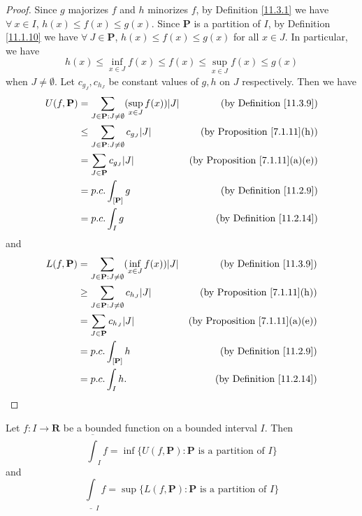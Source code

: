 \begin{proof}
    Since \(g\) majorizes \(f\) and \(h\) minorizes \(f\), by Definition \ref{11.3.1} we have \(\forall\ x \in I\), \(h(x) \leq f(x) \leq g(x)\).
    Since \(\mathbf{P}\) is a partition of \(I\), by Definition \ref{11.1.10} we have \(\forall\ J \in \mathbf{P}\), \(h(x) \leq f(x) \leq g(x)\) for all \(x \in J\).
    In particular, we have
    \[
        h(x) \leq \inf_{x \in J} f(x) \leq f(x) \leq \sup_{x \in J} f(x) \leq g(x)
    \]
    when \(J \neq \emptyset\).
    Let \(c_{g_J}, c_{h_J}\) be constant values of \(g, h\) on \(J\) respectively.
    Then we have
    \begin{align*}
        U(f, \mathbf{P}) & = \sum_{J \in \mathbf{P} : J \neq \emptyset} (\sup_{x \in J} f(x)) \abs*{J} & \text{(by Definition \ref{11.3.9})} \\
        & \leq \sum_{J \in \mathbf{P} : J \neq \emptyset} c_{g_J} \abs*{J} & \text{(by Proposition \ref{7.1.11}(h))} \\
        & = \sum_{J \in \mathbf{P}} c_{g_J} \abs*{J} & \text{(by Proposition \ref{7.1.11}(a)(e))} \\
        & = p.c. \int_{[\mathbf{P}]} g & \text{(by Definition \ref{11.2.9})} \\
        & = p.c. \int_I g & \text{(by Definition \ref{11.2.14})}
    \end{align*}
    and
    \begin{align*}
        L(f, \mathbf{P}) & = \sum_{J \in \mathbf{P} : J \neq \emptyset} (\inf_{x \in J} f(x)) \abs*{J} & \text{(by Definition \ref{11.3.9})} \\
        & \geq \sum_{J \in \mathbf{P} : J \neq \emptyset} c_{h_J} \abs*{J} & \text{(by Proposition \ref{7.1.11}(h))} \\
        & = \sum_{J \in \mathbf{P}} c_{h_J} \abs*{J} & \text{(by Proposition \ref{7.1.11}(a)(e))} \\
        & = p.c. \int_{[\mathbf{P}]} h & \text{(by Definition \ref{11.2.9})} \\
        & = p.c. \int_I h. & \text{(by Definition \ref{11.2.14})}
    \end{align*}
\end{proof}

\begin{proposition}\label{11.3.12}
    Let \(f : I \to \mathbf{R}\) be a bounded function on a bounded interval \(I\).
    Then
    \[
        \overline{\int}_I f = \inf \{U(f, \mathbf{P}) : \mathbf{P} \text{ is a partition of } I\}
    \]
    and
    \[
        \underline{\int}_I f = \sup \{L(f, \mathbf{P}) : \mathbf{P} \text{ is a partition of } I\}
    \]
\end{proposition}

